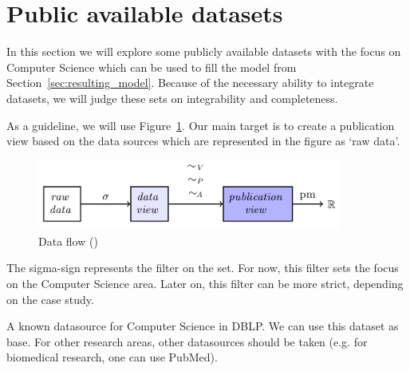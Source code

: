 \documentclass{ou-report}
\begin{document}

\section{Public available datasets}
In this section we will explore some publicly available datasets with the focus 
on Computer Science which can be used to fill the model from 
Section~\ref{sec:resulting_model}. Because of the necessary ability to integrate 
datasets, we will judge these sets on integrability and completeness.

As a guideline, we will use Figure~\ref{fig:dataflow_jm2017_a}. Our main target
is to create a publication view based on the data sources which are represented
in the figure as `raw data'.
\begin{figure}[H]
    \centering
    \includegraphics[width=10cm]{images/data_to_publication_metrics_jm2017.png}
    \caption{Data flow (\cite{JM2017})}
    \label{fig:dataflow_jm2017_a}
\end{figure}

The sigma-sign represents the filter on the set. For now, this filter sets the 
focus on the Computer Science area. Later on, this filter can be more 
strict, depending on the case study.

A known datasource for Computer Science in DBLP. We can use this dataset as base.
For other research areas, other datasources should be taken (e.g. for 
biomedical research, one can use PubMed).
\end{document}
